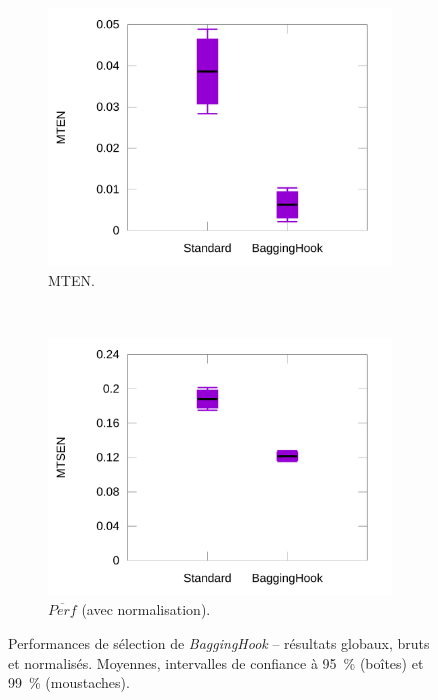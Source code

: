\begin{figure}[htbp]
\begin{subfigure}[t]{0.49\textwidth}
			\includegraphics[width=\textwidth]{figures/ch5/baggingNormErrors}
			\caption{MTEN.}
			\label{fig:baggingNormErrors}
		\end{subfigure}
				~
		\begin{subfigure}[t]{0.49\textwidth}
			\centering
			\includegraphics[width=\textwidth]{figures/ch5/baggingNormProducts}
			\caption{$\overline{Perf}$ (avec normalisation).}
			\label{fig:baggingNormProducts}
		\end{subfigure}
		\caption[\emph{BaggingHook} -- résultats]{Performances de sélection de \emph{BaggingHook} -- résultats globaux, bruts et normalisés. Moyennes, intervalles de confiance à 95~\%{} (boîtes) et 99~\%{} (moustaches).}
		\label{fig:baggingHookAllRes}
	\end{figure}
	

